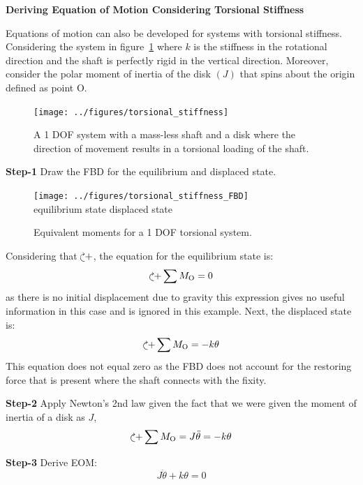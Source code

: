 \documentclass[12pt,letter]{article}
\begin{document}
		\begin{example}	
			\textbf{Deriving Equation of Motion Considering Torsional Stiffness}

			\noindent Equations of motion can also be developed for systems with torsional stiffness. Considering the system in figure~\ref{fig:torsional_stiffness} where $k$ is the stiffness in the rotational direction and the shaft is perfectly rigid in the vertical direction. Moreover, consider the polar moment of inertia of the disk $(J)$ that spins about the origin defined as point O.
			\begin{figure}[H]
				\centering
				\texttt{[image: ../figures/torsional\_stiffness]}
				\caption{A 1 DOF system with a mass-less shaft and a disk where the direction of movement results in a torsional loading of the shaft.}
				\label{fig:torsional_stiffness}
			\end{figure}	
	
			\noindent \textbf{Step-1}
			Draw the FBD for the equilibrium and displaced state.  
			\begin{figure}[H]
				\centering
				\texttt{[image: ../figures/torsional\_stiffness\_FBD]}\\\vspace{0.1cm}
				equilibrium state \hspace{3.6cm} displaced state
				\caption{Equivalent moments for a 1 DOF torsional system.}
			\end{figure}		
			\noindent Considering that $\curveplusclock$, the equation for the equilibrium state is:
			\begin{equation}
				\curveplusclock \sum M_\text{O} =  0
			\end{equation}
			as there is no initial displacement due to gravity this expression gives no useful information in this case and is ignored in this example. Next, the displaced state is:
			\begin{equation}
				\curveplusclock \sum M_\text{O} =  -k \theta
			\end{equation}	
			This equation does not equal zero as the FBD does not account for the restoring force that is present where the shaft connects with the fixity.	

			\noindent \textbf{Step-2} Apply Newton's 2nd law given the fact that we were given the moment of inertia of a disk as $J$,
			\begin{equation}
				\curveplusclock \sum M_\text{O} = J \ddot{\theta} =  -k \theta
			\end{equation}
			
			\noindent \textbf{Step-3} Derive EOM:
			\begin{equation}
				J \ddot{\theta} + k\theta  =0
			\end{equation}	
		\end{example}		
\end{document}
